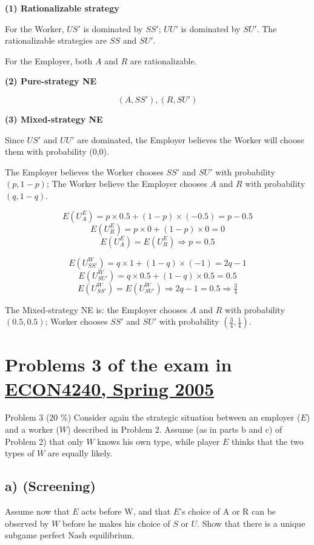 \documentclass{article}
\begin{document}
\textbf{(1) Rationalizable strategy}

\medskip

For the Worker, $US'$ is dominated by $SS'$; $UU'$ is dominated by $SU'$. The rationalizable strategies are $SS$ and $SU'$.

\medskip

For the Employer, both $A$ and $R$ are rationalizable.

\medskip

\textbf{(2) Pure-strategy NE}

$$(A,SS'),(R,SU')$$

\smallskip

\textbf{(3) Mixed-strategy NE}

\medskip

Since $US'$ and $UU'$ are dominated, the Employer believes the Worker will choose 
them with probability (0,0).

\medskip

The Employer believes the Worker chooses $SS'$ and $SU'$ with probability $(p,1-p)$;
The Worker believe the Employer chooses $A$ and $R$ with probability $(q,1-q)$.

$$E(U^E_A) = p \times 0.5 + (1-p) \times (-0.5) = p-0.5$$
$$E(U^E_R) = p \times 0 + (1-p) \times 0 = 0$$
$$E(U^E_A) = E(U^E_R) \Rightarrow p=0.5$$


$$E(U^W_{SS'}) = q \times 1 + (1-q) \times (-1) = 2q-1$$
$$E(U^W_{SU'}) = q \times 0.5 + (1-q) \times 0.5 = 0.5$$
$$E(U^W_{SS'}) = E(U^W_{SU'}) \Rightarrow 2q-1=0.5 \Rightarrow \tfrac34$$

The Mixed-strategy NE is: the Employer chooses $A$ and $R$ with probability $(0.5,0.5)$; Worker chooses $SS'$ and $SU'$ with probability $(\tfrac34,\tfrac14)$.

\section{Problems 3  of the exam in \href{https://www.uio.no/studier/emner/sv/oekonomi/ECON4240/previous-exams/}{ECON4240, Spring 2005}}

Problem 3 (20 \%)
Consider again the strategic situation between an employer ($E$) and a worker ($W$) described in
Problem 2. Assume (as in parts b and c) of Problem 2) that only $W$ knows his own type, while
player $E$ thinks that the two types of $W$ are equally likely.
\subsection*{a) (Screening)} Assume now that $E$ acts before W, and that $E$'s choice of A or R can be
observed by $W$ before he makes his choice of $S$ or $U$. Show that there is a unique
subgame perfect Nash equilibrium.
\end{document}
